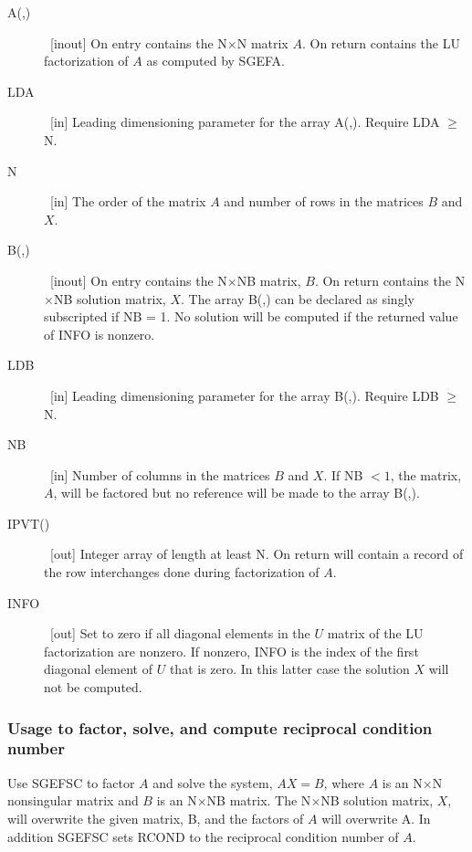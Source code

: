 \documentclass[twoside]{MATH77}
\begin{document}
\begin{description}

\item[A(,)] \ [inout] On entry contains the N$\times $N matrix $A$. On return contains
the LU factorization of $A$ as computed by SGEFA.

\item[LDA] \ [in] Leading dimensioning parameter for the array A(,). Require LDA $
\geq $ N.

\item[N] \ [in] The order of the matrix $A$ and number of rows in the matrices $B$
and $X$.

\item[B(,)] \ [inout] On entry contains the N$\times $NB matrix, $B$. On return
contains the N$\times $NB solution matrix, $X$. The array B(,) can be
declared as singly subscripted if NB = 1. No solution will be computed if
the returned value of INFO is nonzero.

\item[LDB] \ [in] Leading dimensioning parameter for the array B(,). Require LDB $
\geq $ N.

\item[NB] \ [in] Number of columns in the matrices $B$ and $X$. If NB $< 1$, the
matrix, $A$, will be factored but no reference will be made to the array B(,).

\item[IPVT()] \ [out] Integer array of length at least N. On return will contain a
record of the row interchanges done during factorization of $A$.

\item[INFO] \ [out] Set to zero if all diagonal elements in the $U$ matrix of the LU
factorization are nonzero. If nonzero, INFO is the index of the first
diagonal element of $U$ that is zero. In this latter case the solution $X$
will not be computed.

\end{description}

\subsubsection{Usage to factor, solve, and compute reciprocal condition number}

Use SGEFSC to factor $A$ and solve the system, $AX = B$, where $A$ is an
N$\times $N nonsingular matrix and $B$ is an N$\times $NB matrix. The
N$\times $NB solution matrix, $X$, will overwrite the given matrix, B, and
the factors of $A$ will overwrite A. In addition SGEFSC sets RCOND to the
reciprocal condition number of $A$.
\end{document}
